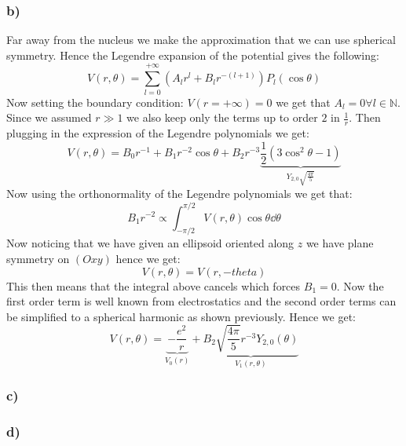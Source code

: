 \documentclass[10pt,a4paper]{book}
\begin{document}
\subsubsection*{b)}
Far away from the nucleus we make the approximation that we can use spherical symmetry. Hence the Legendre expansion of the potential gives the following:
\[
V(r, \theta) = \sum_{l = 0}^{+\infty} (A_l r^l + B_l r^{-(l+1)}) P_l(\cos\theta)
\]
Now setting the boundary condition: $V(r = +\infty) = 0$ we get that $A_l = 0 \forall l \in \mathbb{N}$. Since we assumed $r \gg 1$ we also keep only the terms up to order $2$ in $\frac{1}{r}$. Then plugging in the expression of the Legendre polynomials we get:
\[
V(r, \theta) = B_0 r^{-1} + B_1 r^{-2} \cos \theta + B_2 r^{-3} \underbrace{\frac{1}{2} (3 \cos^2\theta - 1)}_{Y_{2,0} \sqrt{\frac{4 \pi}{5}}}
\]
Now using the orthonormality of the Legendre polynomials we get that:
\[
B_1 r^{-2} \propto \int_{-\pi/2}^{\pi/2} V(r, \theta) \cos \theta \dd \theta
\]
Now noticing that we have given an ellipsoid oriented along $z$ we have plane symmetry on $(Oxy)$ hence we get:
\[
V(r, \theta) = V(r, -theta)
\]
This then means that the integral above cancels which forces $B_1 = 0$. Now the first order term is well known from electrostatics and the second order terms can be simplified to a spherical harmonic as shown previously. Hence we get:
\[
V(r, \theta) = \underbrace{-\frac{e^2}{r}}_{V_0(r)} + \underbrace{B_2 \sqrt{\frac{4\pi}{5}} r^{-3} Y_{2,0}(\theta)}_{V_1(r, \theta)} 
\]

\subsubsection*{c)}


\subsubsection*{d)}
\end{document}

